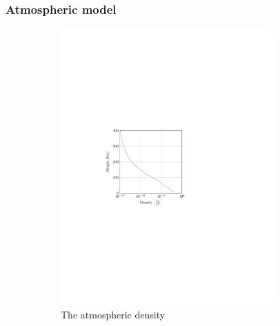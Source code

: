\subsubsection{Atmospheric model}
\label{sec:astroatmos}
\begin{figure}[h]
	\centering
	\begin{subfigure}{0.45\textwidth}
	\centering
	\includegraphics[trim={4cm 9.8cm 9cm 10cm},clip,width=0.9\textwidth]{Figure/atmos_model/density.pdf}
	\caption{The atmospheric density} 
	\label{fig:atmos_height_rho}
	\end{subfigure}
	\begin{subfigure}{0.45\textwidth}
	\centering

\end{subfigure}
\end{figure}
